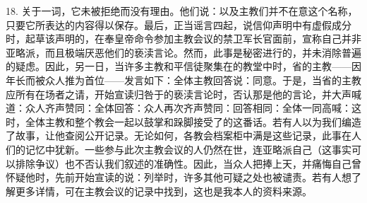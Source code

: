 18. 关于一词，它未被拒绝而没有理由。他们说：以及主教们并不在意这个名称，只要它所表达的内容得以保存。最后，正当谣言四起，说信仰声明中有虚假成分时，起草该声明的，在奉皇帝命令参加主教会议的禁卫军长官面前，宣称自己并非亚略派，而且极端厌恶他们的亵渎言论。然而，此事是秘密进行的，并未消除普遍的疑虑。因此，另一日，当许多主教和平信徒聚集在的教堂中时，省的主教——因年长而被众人推为首位——发言如下：全体主教回答说：同意。于是，当省的主教应所有在场者之请，开始宣读归咎于的亵渎言论时，否认那是他的言论，并大声喊道：众人齐声赞同：全体回答：众人再次齐声赞同：回答相同：全体一同高喊：这时，全体主教和整个教会一起以鼓掌和跺脚接受了的这番话。若有人以为我们编造了故事，让他查阅公开记录。无论如何，各教会档案柜中满是这些记录，此事在人们的记忆中犹新。一些参与此次主教会议的人仍然在世，连亚略派自己（这事实可以排除争议）也不否认我们叙述的准确性。因此，当众人把捧上天，并痛悔自己曾怀疑他时，先前开始宣读的说：列举时，许多其他可疑之处也被谴责。若有人想了解更多详情，可在主教会议的记录中找到，这也是我本人的资料来源。\par


